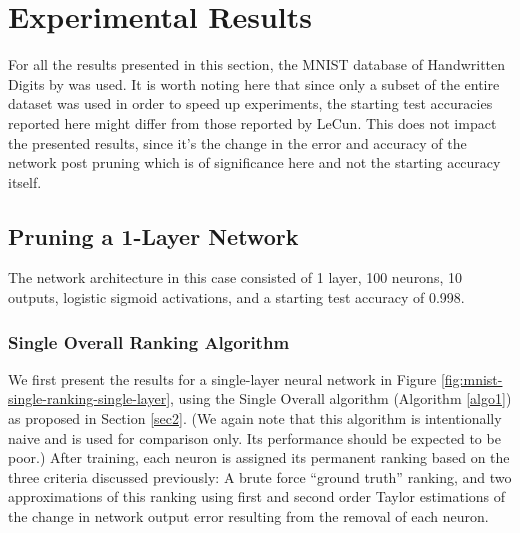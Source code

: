 \section{Experimental Results}
For all the results presented in this section, the MNIST database of Handwritten Digits by \cite{lecun-mnisthandwrittendigit-2010} was used. It is worth noting here that since only a subset of the entire dataset was used in order to speed up experiments, the starting test accuracies reported here might differ from those reported by LeCun. This does not impact the presented results, since it's the change in the error and accuracy of the network post pruning which is of significance here and not the starting accuracy itself.

\subsection{Pruning a 1-Layer Network}
The network architecture in this case consisted of 1 layer, 100 neurons, 10 outputs, logistic sigmoid activations, and a starting test accuracy of 0.998.
\subsubsection{Single Overall Ranking Algorithm}
We first present the results for a single-layer neural network in Figure \ref{fig:mnist-single-ranking-single-layer}, using the Single Overall algorithm (Algorithm \ref{algo1}) as proposed in Section \ref{sec2}. (We again note that this algorithm is intentionally naive and is used for comparison only. Its performance should be expected to be poor.) After training, each neuron is assigned its permanent ranking based on the three criteria discussed previously: A brute force ``ground truth'' ranking, and two approximations of this ranking using first and second order Taylor estimations of the change in network output error resulting from the removal of each neuron. 

